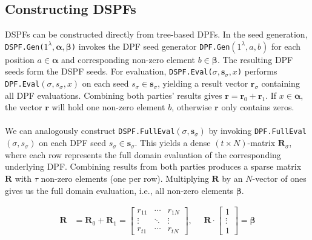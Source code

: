 \subsection{Constructing DSPFs}
\label{subseq:constructingTBDSPFs}
DSPFs can be constructed directly from tree-based DPFs. In the seed generation, \texttt{DSPF.Gen($1^\lambda, \boldsymbol{\alpha}, \boldsymbol{\beta}$)} invokes the DPF seed generator \texttt{DPF.Gen}$(1^\lambda, a, b)$ for each position $a \in \boldsymbol{\alpha}$ and corresponding non-zero element $b \in \boldsymbol{\beta}$. The resulting DPF seeds form the DSPF seeds. For evaluation, \texttt{DSPF.Eval($\sigma, \boldsymbol{s}_\sigma, x$)}  performs \texttt{DPF.Eval}$(\sigma, s_\sigma, x)$ on each seed $s_\sigma\in\boldsymbol{s}_\sigma$, yielding a result vector $\boldsymbol{r}_\sigma$ containing all DPF evaluations. Combining both parties' results gives $\boldsymbol{r} = \boldsymbol{r}_0 + \boldsymbol{r}_1$. If $x\in\boldsymbol{\alpha}$, the 
vector $\boldsymbol{r}$ will hold one non-zero element $b$, otherwise $\boldsymbol{r}$ only contains zeros.
\\\\
We can analogously construct \texttt{DSPF.FullEval}$(\sigma, \boldsymbol{s}_\sigma)$ by invoking \texttt{DPF.FullEval}$(\sigma, s_\sigma)$ on each DPF seed $s_\sigma\in\boldsymbol{s}_\sigma$. This yields a dense $(t\times N)$-matrix $\boldsymbol{R}_\sigma$, where each row represents the full domain evaluation of the corresponding underlying DPF. Combining results from both parties produces a sparse matrix $\boldsymbol{R}$ with $\tau$ non-zero elements (one per row).  Multiplying $\boldsymbol{R}$ by an $N$-vector of ones gives us the full domain evaluation, i.e., all non-zero elements $\boldsymbol{\beta}$.

\begin{equation}
\begin{aligned}
\boldsymbol{R} &= \boldsymbol{R}_0 + \boldsymbol{R}_1 = \begin{bmatrix} r_{11} & \cdots & r_{1N} \\ \vdots & \ddots & \vdots \\ r_{t1} & \cdots & r_{tN} \end{bmatrix}, \:\:\:\:\:\:  \boldsymbol{R} \cdot \begin{bmatrix} 1 \\ \vdots \\ 1 \end{bmatrix} = \boldsymbol{\beta}
\end{aligned}
\end{equation}

